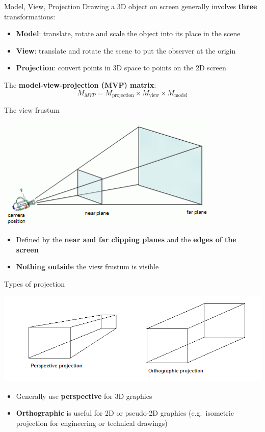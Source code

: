 \begin{frame}{Model, View, Projection}
	\pause Drawing a 3D object on screen generally involves \textbf{three} transformations:
	\begin{itemize}
		\pause\item \textbf{Model}: translate, rotate and scale the object into its place in the scene
		\pause\item \textbf{View}: translate and rotate the scene to put the observer at the origin
		\pause\item \textbf{Projection}: convert points in 3D space to points on the 2D screen
	\end{itemize}
	\pause The \textbf{model-view-projection (MVP) matrix}:
		$$ M_{MVP} = M_{\text{projection}} \times M_{\text{view}} \times M_{\text{model}} $$
\end{frame}

\begin{frame}{The view frustum}
	\pause\begin{center}
		\includegraphics[width=0.8\textwidth]{frustum}
	\end{center}
	\begin{itemize}
		\pause\item Defined by the \textbf{near and far clipping planes} and the \textbf{edges of the screen}
		\pause\item \textbf{Nothing outside} the view frustum is visible
	\end{itemize}
\end{frame}


\begin{frame}{Types of projection}
	\pause\begin{center}
		\includegraphics[width=\textwidth]{orthographic_perspective}
	\end{center}
	\begin{itemize}
		\pause\item Generally use \textbf{perspective} for 3D graphics
		\pause\item \textbf{Orthographic} is useful for 2D or pseudo-2D graphics (e.g.\ isometric projection for engineering or technical drawings)
	\end{itemize}
\end{frame}